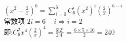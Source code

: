 \documentclass[class=ctexart,crop=false]{standalone}
\begin{document}
$(x^2+\frac{2}{x})^6=\sum\limits_{i=0}^6 C_6^i(x^2)^i(\frac{2}{x})^{6-i}$\\
常数项 $2i=6-i\Rightarrow i=2$\\
即:$C_6^2x^4(\frac{2}{x})^4=\frac{6!2^4}{2!4!}=\frac{6\times 5\times 16}{2}=240$
\end{document}
